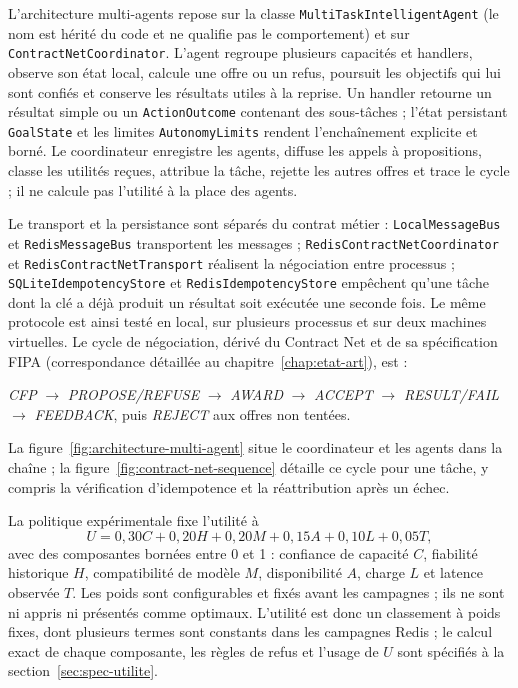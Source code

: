 L'architecture multi-agents repose sur la classe \texttt{MultiTaskIntelligentAgent} (le nom est hérité du code et ne qualifie pas le comportement) et sur \texttt{ContractNetCoordinator}. L'agent regroupe plusieurs capacités et handlers, observe son état local, calcule une offre ou un refus, poursuit les objectifs qui lui sont confiés et conserve les résultats utiles à la reprise. Un handler retourne un résultat simple ou un \texttt{ActionOutcome} contenant des sous-tâches ; l'état persistant \texttt{GoalState} et les limites \texttt{AutonomyLimits} rendent l'enchaînement explicite et borné. Le coordinateur enregistre les agents, diffuse les appels à propositions, classe les utilités reçues, attribue la tâche, rejette les autres offres et trace le cycle ; il ne calcule pas l'utilité à la place des agents.

Le transport et la persistance sont séparés du contrat métier : \texttt{LocalMessageBus} et \texttt{RedisMessageBus} transportent les messages ; \texttt{RedisContractNetCoordinator} et \texttt{RedisContractNetTransport} réalisent la négociation entre processus ; \texttt{SQLiteIdempotencyStore} et \texttt{RedisIdempotencyStore} empêchent qu'une tâche dont la clé a déjà produit un résultat soit exécutée une seconde fois. Le même protocole est ainsi testé en local, sur plusieurs processus et sur deux machines virtuelles. Le cycle de négociation, dérivé du Contract Net \cite{smith1980contract} et de sa spécification FIPA \cite{fipa2002contractnet} (correspondance détaillée au chapitre~\ref{chap:etat-art}), est :
\begin{center}
\textit{CFP} $\rightarrow$ \textit{PROPOSE/REFUSE} $\rightarrow$ \textit{AWARD} $\rightarrow$ \textit{ACCEPT} $\rightarrow$ \textit{RESULT/FAIL} $\rightarrow$ \textit{FEEDBACK}, puis \textit{REJECT} aux offres non tentées.
\end{center}
La figure~\ref{fig:architecture-multi-agent} situe le coordinateur et les agents dans la chaîne ; la figure~\ref{fig:contract-net-sequence} détaille ce cycle pour une tâche, y compris la vérification d'idempotence et la réattribution après un échec.

La politique expérimentale fixe l'utilité à
\[
U=0{,}30C+0{,}20H+0{,}20M+0{,}15A+0{,}10L+0{,}05T,
\]
avec des composantes bornées entre 0 et 1 : confiance de capacité $C$, fiabilité historique $H$, compatibilité de modèle $M$, disponibilité $A$, charge $L$ et latence observée $T$. Les poids sont configurables et fixés avant les campagnes ; ils ne sont ni appris ni présentés comme optimaux. L'utilité est donc un classement à poids fixes, dont plusieurs termes sont constants dans les campagnes Redis ; le calcul exact de chaque composante, les règles de refus et l'usage de $U$ sont spécifiés à la section~\ref{sec:spec-utilite}.

